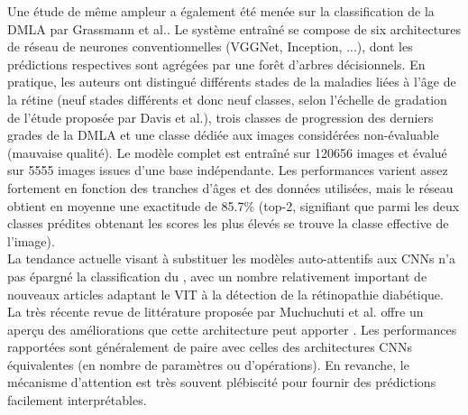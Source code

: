 Une étude de même ampleur a également été menée sur la classification de la \ac{DMLA} par Grassmann et al.\cite{grassmannDeepLearningAlgorithm2018a}. Le système entraîné se compose de six architectures de réseau de neurones conventionnelles (VGGNet, Inception, ...), dont les prédictions respectives sont agrégées par une forêt d'arbres décisionnels. En pratique, les auteurs ont distingué différents stades de la maladies liées à l'âge de la rétine (neuf stades différents et donc neuf classes, selon l'échelle de gradation de l'étude proposée par Davis et al.\cite{davisAgeRelatedEyeDisease2005}), trois classes de progression des derniers grades de la \ac{DMLA} et une classe dédiée aux images considérées non-évaluable (mauvaise qualité). Le modèle complet est entraîné sur 120656 images et évalué sur 5555 images issues d'une base indépendante. Les performances varient assez fortement en fonction des tranches d'âges et des données utilisées, mais le réseau obtient en moyenne une exactitude de 85.7\% (top-2, signifiant que parmi les deux classes prédites obtenant les scores les plus élevés se trouve la classe effective de l'image).
\\
La tendance actuelle visant à substituer les modèles auto-attentifs aux CNNs n'a pas épargné la classification du \fundus{}, avec un nombre relativement important de nouveaux articles adaptant le \ac{VIT} à la détection de la rétinopathie diabétique. La très récente revue de littérature proposée par Muchuchuti et al. \cite{muchuchutiRetinalDiseaseDetection2023} offre un aperçu des améliorations que cette architecture peut apporter \cite{wuVisionTransformerbasedRecognition2021, guClassificationDiabeticRetinopathy2023a, sunLesionAwareTransformersDiabetic2021b, adakDetectingSeverityDiabetic2023}. Les performances rapportées sont généralement de paire avec celles des architectures CNNs équivalentes (en nombre de paramètres ou d'opérations). En revanche, le mécanisme d'attention est très souvent plébiscité pour fournir des prédictions facilement interprétables.
